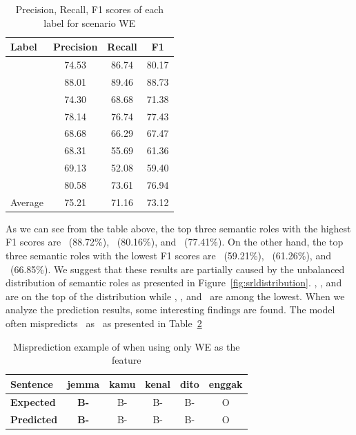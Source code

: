 \begin{table}
	\centering
	\caption{Precision, Recall, F1 scores of each label for scenario WE}
	\label{tab:ex11srl}
	\begin{tabular}{lccc}
		\hline
		Label & Precision & Recall & F1 \\
		\hline\hline
		\agent & 74.53 & 86.74 & 80.17 \\
		\predicate & 88.01 & 89.46 & 88.73 \\
		\patient & 74.30 & 68.68 & 71.38 \\
		\modal & 78.14 & 76.74 & 77.43 \\
		\beneficiary & 68.68 & 66.29 & 67.47 \\
		\location & 68.31 & 55.69 & 61.36 \\
		\greet & 69.13 & 52.08 & 59.40 \\
		\timesrl & 80.58 & 73.61 & 76.94 \\
		\hline
		Average & 75.21 & 71.16 & 73.12\\
		\hline
	\end{tabular}

\end{table}


As we can see from the table above, the top three semantic roles with the highest F1 scores are \predicate~(88.72\%), \agent~(80.16\%), and \modal~(77.41\%). On the other hand, the top three semantic roles with the lowest F1 scores are \greet~(59.21\%), \location~(61.26\%), and \beneficiary~(66.85\%). We suggest that these results are partially caused by the unbalanced distribution of semantic roles as presented in Figure~\ref{fig:srldistribution}. \predicate, \agent, and \modal~ are on the top of the distribution while \greet, \location, and \beneficiary~are among the lowest. When we analyze the prediction results, some interesting findings are found. The model often mispredicts \greet~as \agent~as presented in Table~\ref{tab:contohgreetagent}

\begin{table}
	\centering
	\caption{Misprediction example of \greet when using only WE as the feature}
	\label{tab:contohgreetagent}
	\begin{tabular}{|l|ccccc|}
		\hline
		\textbf{Sentence} 				& jemma & kamu & kenal & dito & enggak \\
		\hline
		\textbf{Expected}				& \textbf{B-\greet} & B-\agent & B-\predicate & B-\patient  & O\\
		\hline
		\textbf{Predicted}		& \textbf{B-\agent} & B-\agent & B-\predicate & B-\patient  & O\\
		\hline
	\end{tabular}
\end{table}

